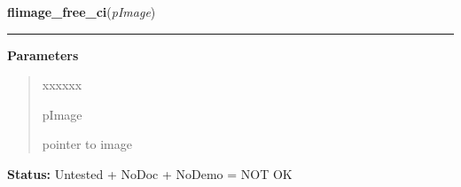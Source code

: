     \label{xformslib:library:flimage_free_ci}

    \vspace{0.5ex}

\hspace{.8\funcindent}\begin{boxedminipage}{\funcwidth}

    \raggedright \textbf{flimage\_free\_ci}(\textit{pImage})

    \vspace{-1.5ex}

    \rule{\textwidth}{0.5\fboxrule}
\setlength{\parskip}{2ex}
\setlength{\parskip}{1ex}
      \textbf{Parameters}
      \vspace{-1ex}

      \begin{quote}
        \begin{Ventry}{xxxxxx}

          \item[pImage]

          pointer to image

        \end{Ventry}

      \end{quote}

\textbf{Status:} Untested + NoDoc + NoDemo = NOT OK



    \end{boxedminipage}

    \label{xformslib:library:flimage_free_gray}

    \vspace{0.5ex}

